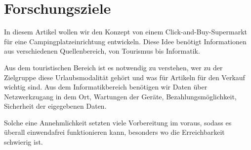 \section{Forschungsziele}

In diesem Artikel wollen wir den Konzept von einem Click-and-Buy-Supermarkt für eine
Campingplatzeinrichtung entwickeln. Diese Idee benötigt Informationen aus verschiedenen
Quellenbereich, von Tourismus bis Informatik. 


Aus dem touristischen Bereich ist es notwendig zu verstehen, wer zu der Zielgruppe
diese Urlaubsmodalität gehört und was für Artikeln für den Verkauf wichtig sind. 
Aus dem Informatikbereich benötigen wir Daten über  Netzwerkzugang in dem Ort, 
Wartungen der Geräte, Bezahlungsmöglichkeit, Sicherheit der eigegebenen Daten.


Solche eine Annehmlichkeit setzten viele Vorbereitung im voraus, sodass es überall
einwendafrei funktionieren kann, besonders wo die Erreichbarkeit schwierig ist. 